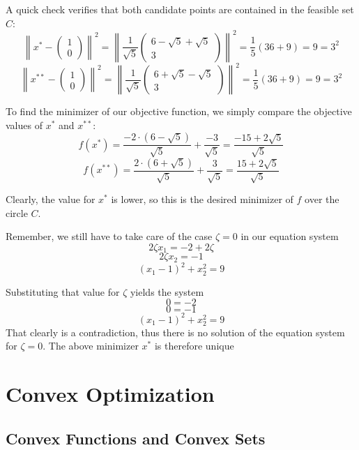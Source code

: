 \documentclass{article}
\begin{document}
A quick check verifies that both candidate points are contained in the feasible set $C$:
\[
\left\|x^{*}-\begin{pmatrix}1\\ 0\end{pmatrix}\right\|^{2} =\left\|\frac{1}{\sqrt{5}}\begin{pmatrix}6-\sqrt{5}+\sqrt{5}\\ 3\end{pmatrix}\right\|^{2}=\frac{1}{5}(36+9)=9=3^{2}
\]
\[
\left\|x^{**}-\begin{pmatrix}1\\ 0\end{pmatrix}\right\|^{2} =\left\|\frac{1}{\sqrt{5}}\begin{pmatrix}6+\sqrt{5}-\sqrt{5}\\ 3\end{pmatrix}\right\|^{2}=\frac{1}{5}(36+9)=9=3^{2}
\]

To find the minimizer of our objective function, we simply compare the objective values of $x^{*}$ and $x^{**}$:
\[
f(x^{*}) =\frac{-2\cdot(6-\sqrt{5})}{\sqrt{5}}+\frac{-3}{\sqrt{5}}=\frac{-15+2\sqrt{5}}{\sqrt{5}}
\]
\[
f(x^{**}) =\frac{2\cdot(6+\sqrt{5})}{\sqrt{5}}+\frac{3}{\sqrt{5}}=\frac{15+2\sqrt{5}}{\sqrt{5}}
\]

Clearly, the value for $x^{*}$ is lower, so this is the desired minimizer of $f$ over the circle $C$.

Remember, we still have to take care of the case $\zeta=0$ in our equation system
\[
2\zeta x_{1} =-2+2\zeta
\]
\[
2\zeta x_{2} =-1
\]
\[
(x_{1}-1)^{2}+x_{2}^{2} =9
\]

Substituting that value for $\zeta$ yields the system
\[
0 =-2
\]
\[
0 =-1
\]
\[
(x_{1}-1)^{2}+x_{2}^{2} =9
\]
That clearly is a contradiction, thus there is no solution of the equation system for $\zeta = 0$. The above
minimizer $x^{*}$ is therefore unique
\section{Convex Optimization}
\subsection{Convex Functions and Convex Sets}
\end{document}
